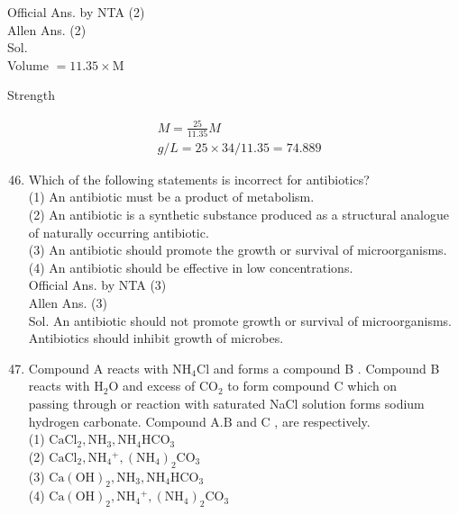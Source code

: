\documentclass[10pt]{article}
\begin{document}
Official Ans. by NTA (2)\\
Allen Ans. (2)\\
Sol.\\
Volume \(=11.35 \times \mathrm{M}\)

Strength

\[
\begin{aligned}
& M=\frac{25}{11.35} M \\
& g / L=25 \times 34 / 11.35=74.889
\end{aligned}
\]

\begin{enumerate}
  \setcounter{enumi}{45}
  \item Which of the following statements is incorrect for antibiotics?\\
(1) An antibiotic must be a product of metabolism.\\
(2) An antibiotic is a synthetic substance produced as a structural analogue of naturally occurring antibiotic.\\
(3) An antibiotic should promote the growth or survival of microorganisms.\\
(4) An antibiotic should be effective in low concentrations.\\
Official Ans. by NTA (3)\\
Allen Ans. (3)\\
Sol. An antibiotic should not promote growth or survival of microorganisms. Antibiotics should inhibit growth of microbes.
  \item Compound A reacts with \(\mathrm{NH}_{4} \mathrm{Cl}\) and forms a compound B . Compound B reacts with \(\mathrm{H}_{2} \mathrm{O}\) and excess of \(\mathrm{CO}_{2}\) to form compound C which on\\
passing through or reaction with saturated NaCl solution forms sodium hydrogen carbonate. Compound \(\mathrm{A} . \mathrm{B}\) and C , are respectively.\\
(1) \(\mathrm{CaCl}_{2}, \mathrm{NH}_{3}, \mathrm{NH}_{4} \mathrm{HCO}_{3}\)\\
(2) \(\mathrm{CaCl}_{2}, \mathrm{NH}_{4}{ }^{+},\left(\mathrm{NH}_{4}\right)_{2} \mathrm{CO}_{3}\)\\
(3) \(\mathrm{Ca}(\mathrm{OH})_{2}, \mathrm{NH}_{3}, \mathrm{NH}_{4} \mathrm{HCO}_{3}\)\\
(4) \(\mathrm{Ca}(\mathrm{OH})_{2}, \mathrm{NH}_{4}{ }^{+},\left(\mathrm{NH}_{4}\right)_{2} \mathrm{CO}_{3}\)
\end{enumerate}
\end{document}
